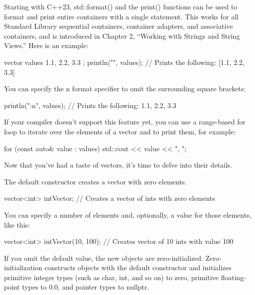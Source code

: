 Starting with C++23, std::format() and the print() functions can be used to format and print entire containers with a single statement. This works for all Standard Library sequential containers, container adapters, and associative containers, and is introduced in Chapter 2, “Working with Strings and String Views.” Here is an example:

\begin{cpp}
vector values { 1.1, 2.2, 3.3 };
println("{}", values); // Prints the following: [1.1, 2.2, 3.3]
\end{cpp}

You can specify the n format specifier to omit the surrounding square brackets:

\begin{cpp}
println("{:n}", values); // Prints the following: 1.1, 2.2, 3.3
\end{cpp}

If your compiler doesn’t support this feature yet, you can use a range-based for loop to iterate over the elements of a vector and to print them, for example:

\begin{cpp}
for (const auto& value : values) { std::cout << value << ", "; }
\end{cpp}



Now that you’ve had a taste of vectors, it’s time to delve into their details.


The default constructor creates a vector with zero elements.

\begin{cpp}
vector<int> intVector; // Creates a vector of ints with zero elements
\end{cpp}

You can specify a number of elements and, optionally, a value for those elements, like this:

\begin{cpp}
vector<int> intVector(10, 100); // Creates vector of 10 ints with value 100
\end{cpp}

If you omit the default value, the new objects are zero-initialized. Zero-initialization constructs objects with the default constructor and initializes primitive integer types (such as char, int, and so on) to zero, primitive floating-point types to 0.0, and pointer types to nullptr.

